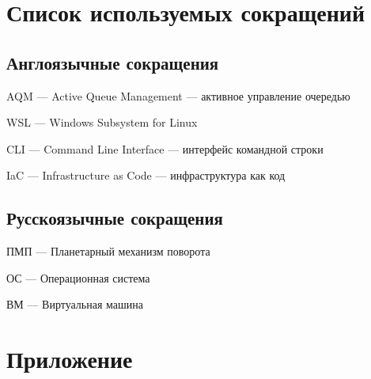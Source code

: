 \documentclass[
  english,
  russian,
  12pt,
  a4paper,
]{phdthesr}
\begin{document}

\chapter*{Список используемых
сокращений}\label{ux441ux43fux438ux441ux43eux43a-ux438ux441ux43fux43eux43bux44cux437ux443ux435ux43cux44bux445-ux441ux43eux43aux440ux430ux449ux435ux43dux438ux439}


\section*{Англоязычные
сокращения}\label{ux430ux43dux433ux43bux43eux44fux437ux44bux447ux43dux44bux435-ux441ux43eux43aux440ux430ux449ux435ux43dux438ux44f}


AQM --- Active Queue Management --- активное управление очередью

WSL --- Windows Subsystem for Linux

CLI --- Command Line Interface --- интерфейс командной строки

IaC --- Infrastructure as Code --- инфраструктура как код

\section*{Русскоязычные
сокращения}\label{ux440ux443ux441ux441ux43aux43eux44fux437ux44bux447ux43dux44bux435-ux441ux43eux43aux440ux430ux449ux435ux43dux438ux44f}


ПМП --- Планетарный механизм поворота

ОС --- Операционная система

ВМ --- Виртуальная машина

\cleardoublepage
{}
{}
\appendix

\chapter{Приложение}\label{ux43fux440ux438ux43bux43eux436ux435ux43dux438ux435}
\end{document}
